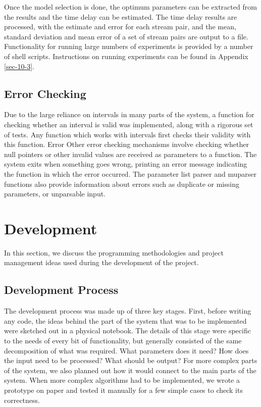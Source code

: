\documentclass[a4paper,11pt,twoside]{article}
\begin{document}
   Once the model selection is done, the optimum parameters can be extracted
   from the results and the time delay can be estimated. The time delay results
   are processed, with the estimate and error for each stream pair, and the
   mean, standard deviation and mean error of a set of stream pairs are output
   to a file. Functionality for running large numbers of experiments is provided
   by a number of shell scripts. Instructions on running experiments can be
   found in Appendix \ref{sec-10-3}.
\subsection{Error Checking}
\label{sec-6-10}

   Due to the large reliance on intervals in many parts of the system, a
   function for checking whether an interval is valid was implemented, along
   with a rigorous set of tests. Any function which works with intervals first
   checks their validity with this function. Error Other error checking
   mechanisms involve checking whether null pointers or other invalid values are
   received as parameters to a function. The system exits when something goes
   wrong, printing an error message indicating the function in which the error
   occurred. The parameter list parser and muparser functions also provide
   information about errors such as duplicate or missing parameters, or
   unparsable input.
\section{Development}
\label{sec-7}

  In this section, we discuss the programming methodologies and project management
  ideas used during the development of the project.
\subsection{Development Process}
\label{sec-7-1}

   The development process was made up of three key stages. First, before
   writing any code, the ideas behind the part of the system that was to be
   implemented were sketched out in a physical notebook. The details of this
   stage were specific to the needs of every bit of functionality, but generally
   consisted of the same decomposition of what was required. What parameters
   does it need? How does the input need to be processed? What should be output?
   For more complex parts of the system, we also planned out how it would
   connect to the main parts of the system. When more complex algorithms had to
   be implemented, we wrote a prototype on paper and tested it manually for a
   few simple cases to check its correctness.
\end{document}
